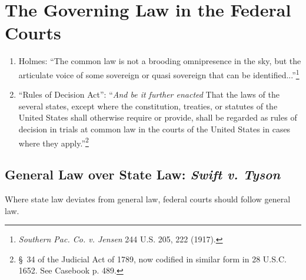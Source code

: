 \section{The Governing Law in the Federal Courts}

\begin{enumerate}
    \item Holmes: ``The common law is not a brooding omnipresence in the sky, 
    but the articulate voice of some sovereign or quasi sovereign that can be 
    identified...''\footnote{\emph{Southern Pac. Co. v. Jensen} 244 U.S. 205, 
    222 (1917).}
    \item ``Rules of Decision Act'': 
    ``\emph{And be it further enacted} That the laws of the several states, 
    except where the constitution, treaties, or statutes of the United States 
    shall otherwise require or provide, shall be regarded as rules of decision 
    in trials at common law in the courts of the United States in cases where 
    they apply.''\footnote{\S\ 34 of the Judicial Act of 1789, now codified in 
    similar form in 28 U.S.C. 1652. See Casebook p. 489.}
\end{enumerate}

\subsection{General Law over State Law: \emph{Swift v. Tyson}}

Where state law deviates from general law, federal courts should follow 
general law.

